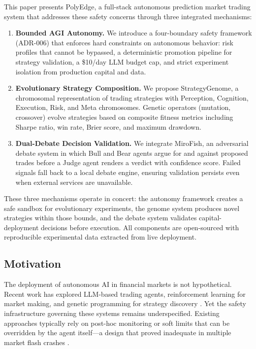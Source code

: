 \documentclass[11pt]{article}
\begin{document}
This paper presents PolyEdge, a full-stack autonomous prediction market trading system that addresses these safety concerns through three integrated mechanisms:

\begin{enumerate}
    \item \textbf{Bounded AGI Autonomy.} We introduce a four-boundary safety framework (ADR-006) that enforces hard constraints on autonomous behavior: risk profiles that cannot be bypassed, a deterministic promotion pipeline for strategy validation, a \$10/day LLM budget cap, and strict experiment isolation from production capital and data.
    
    \item \textbf{Evolutionary Strategy Composition.} We propose StrategyGenome, a chromosomal representation of trading strategies with Perception, Cognition, Execution, Risk, and Meta chromosomes. Genetic operators (mutation, crossover) evolve strategies based on composite fitness metrics including Sharpe ratio, win rate, Brier score, and maximum drawdown.
    
    \item \textbf{Dual-Debate Decision Validation.} We integrate MiroFish, an adversarial debate system in which Bull and Bear agents argue for and against proposed trades before a Judge agent renders a verdict with confidence score. Failed signals fall back to a local debate engine, ensuring validation persists even when external services are unavailable.
\end{enumerate}

These three mechanisms operate in concert: the autonomy framework creates a safe sandbox for evolutionary experiments, the genome system produces novel strategies within those bounds, and the debate system validates capital-deployment decisions before execution. All components are open-sourced with reproducible experimental data extracted from live deployment.

\subsection{Motivation}\label{sec:intro:motivation}

The deployment of autonomous AI in financial markets is not hypothetical. Recent work has explored LLM-based trading agents, reinforcement learning for market making, and genetic programming for strategy discovery \citep{lopez2018advances, koza1992genetic, poli2008field}. Yet the safety infrastructure governing these systems remains underspecified. Existing approaches typically rely on post-hoc monitoring or soft limits that can be overridden by the agent itself---a design that proved inadequate in multiple market flash crashes \citep{nygard2018release}.
\end{document}
